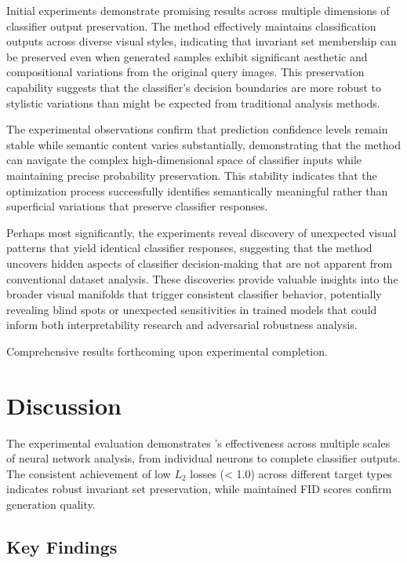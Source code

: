 Initial experiments demonstrate promising results across multiple dimensions of classifier output preservation. The method effectively maintains classification outputs across diverse visual styles, indicating that invariant set membership can be preserved even when generated samples exhibit significant aesthetic and compositional variations from the original query images. This preservation capability suggests that the classifier's decision boundaries are more robust to stylistic variations than might be expected from traditional analysis methods.

The experimental observations confirm that prediction confidence levels remain stable while semantic content varies substantially, demonstrating that the method can navigate the complex high-dimensional space of classifier inputs while maintaining precise probability preservation. This stability indicates that the optimization process successfully identifies semantically meaningful rather than superficial variations that preserve classifier responses. 

Perhaps most significantly, the experiments reveal discovery of unexpected visual patterns that yield identical classifier responses, suggesting that the method uncovers hidden aspects of classifier decision-making that are not apparent from conventional dataset analysis. These discoveries provide valuable insights into the broader visual manifolds that trigger consistent classifier behavior, potentially revealing blind spots or unexpected sensitivities in trained models that could inform both interpretability research and adversarial robustness analysis.

Comprehensive results forthcoming upon experimental completion.

\section{Discussion}

The experimental evaluation demonstrates \method{}'s effectiveness across multiple scales of neural network analysis, from individual neurons to complete classifier outputs. The consistent achievement of low $L_2$ losses (< 1.0) across different target types indicates robust invariant set preservation, while maintained FID scores confirm generation quality.

\subsection{Key Findings}

